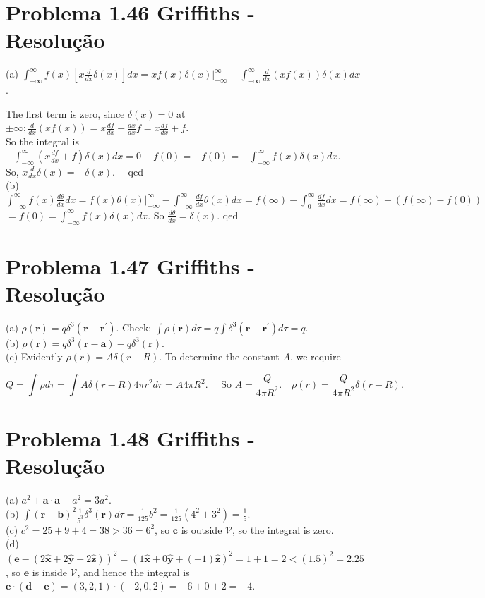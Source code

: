 \documentclass[a4paper,12pt]{article}
\begin{document}
\section*{Problema 1.46 Griffiths - Resolu\c{c}\~ao}

(a) $\int_{-\infty}^{\infty} f(x)\left[x \frac{d}{d x} \delta(x)\right] d x=\left.x f(x) \delta(x)\right|_{-\infty} ^{\infty}-\int_{-\infty}^{\infty} \frac{d}{d x}(x f(x)) \delta(x) d x$.

The first term is zero, since $\delta(x)=0$ at $\pm \infty ; \frac{d}{d x}(x f(x))=x \frac{d f}{d x}+\frac{d x}{d x} f=x \frac{d f}{d x}+f$.\\
So the integral is $-\int_{-\infty}^{\infty}\left(x \frac{d f}{d x}+f\right) \delta(x) d x=0-f(0)=-f(0)=-\int_{-\infty}^{\infty} f(x) \delta(x) d x$.\\
So, $x \frac{d}{d x} \delta(x)=-\delta(x) . \quad$ qed\\
(b) $\int_{-\infty}^{\infty} f(x) \frac{d \theta}{d x} d x=\left.f(x) \theta(x)\right|_{-\infty} ^{\infty}-\int_{-\infty}^{\infty} \frac{d f}{d x} \theta(x) d x=f(\infty)-\int_{0}^{\infty} \frac{d f}{d x} d x=f(\infty)-(f(\infty)-f(0))$ $=f(0)=\int_{-\infty}^{\infty} f(x) \delta(x) d x$. So $\frac{d \theta}{d x}=\delta(x)$. qed


\section*{Problema 1.47 Griffiths - Resolu\c{c}\~ao}

(a) $\rho(\mathbf{r})=q \delta^{3}\left(\mathbf{r}-\mathbf{r}^{\prime}\right)$. Check: $\int \rho(\mathbf{r}) d \tau=q \int \delta^{3}\left(\mathbf{r}-\mathbf{r}^{\prime}\right) d \tau=q$.\\
(b) $\rho(\mathbf{r})=q \delta^{3}(\mathbf{r}-\mathbf{a})-q \delta^{3}(\mathbf{r})$.\\
(c) Evidently $\rho(r)=A \delta(r-R)$. To determine the constant $A$, we require

$$
Q=\int \rho d \tau=\int A \delta(r-R) 4 \pi r^{2} d r=A 4 \pi R^{2} . \quad \text { So } A=\frac{Q}{4 \pi R^{2}} . \quad \rho(r)=\frac{Q}{4 \pi R^{2}} \delta(r-R) .
$$


\section*{Problema 1.48 Griffiths - Resolu\c{c}\~ao}

(a) $a^{2}+\mathbf{a} \cdot \mathbf{a}+a^{2}=3 a^{2}$.\\
(b) $\int(\mathbf{r}-\mathbf{b})^{2} \frac{1}{5^{3}} \delta^{3}(\mathbf{r}) d \tau=\frac{1}{125} b^{2}=\frac{1}{125}\left(4^{2}+3^{2}\right)=\frac{1}{5}$.\\
(c) $c^{2}=25+9+4=38>36=6^{2}$, so $\mathbf{c}$ is outside $\mathcal{V}$, so the integral is zero.\\
(d) $(\mathbf{e}-(2 \hat{\mathbf{x}}+2 \hat{\mathbf{y}}+2 \hat{\mathbf{z}}))^{2}=(1 \hat{\mathbf{x}}+0 \hat{\mathbf{y}}+(-1) \hat{\mathbf{z}})^{2}=1+1=2<(1.5)^{2}=2.25$, so $\mathbf{e}$ is inside $\mathcal{V}$, and hence the integral is $\mathbf{e} \cdot(\mathbf{d}-\mathbf{e})=(3,2,1) \cdot(-2,0,2)=-6+0+2=-4$.
\end{document}
